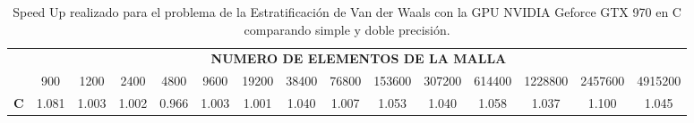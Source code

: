 \begin{table}[]
\begin{tabular}{|c|c|c|c|c|c|c|c|c|c|c|c|c|c|c|}
\hline
\multirow{2}{*}{} & \multicolumn{14}{c|}{\textbf{NUMERO DE ELEMENTOS DE LA MALLA}}                                                         \\ \cline{2-15} 
                  & 900   & 1200  & 2400  & 4800  & 9600  & 19200 & 38400 & 76800 & 153600 & 307200 & 614400 & 1228800 & 2457600 & 4915200 \\ \hline
\textbf{C}        & 1.081 & 1.003 & 1.002 & 0.966 & 1.003 & 1.001 & 1.040 & 1.007 & 1.053  & 1.040  & 1.058  & 1.037   & 1.100   & 1.045   \\ \hline
\end{tabular}
\caption{Speed Up realizado para el problema de la Estratificación de Van der Waals con la GPU NVIDIA Geforce GTX 970 en C comparando simple y doble precisión.}
\label{tab:c_970_VdW_c_10}
\end{table}